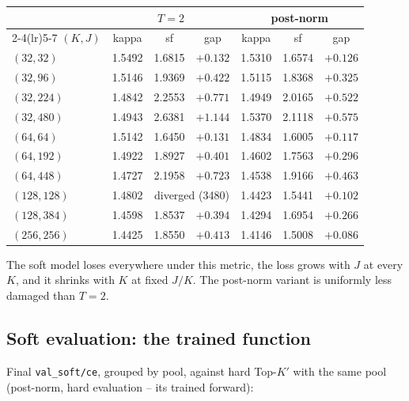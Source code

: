 \documentclass[11pt,a4paper]{article}
\newcommand{\code}[1]{\texttt{#1}}
\newcommand{\Kp}{K'}
\begin{document}
\begin{center}\small
\begin{tabular}{lcccccc}
\toprule
& \multicolumn{3}{c}{$T=2$} & \multicolumn{3}{c}{post-norm} \\
\cmidrule(lr){2-4}\cmidrule(lr){5-7}
$(K,J)$ & kappa & sf & gap & kappa & sf & gap \\
\midrule
$(32,32)$   & 1.5492 & 1.6815 & $+0.132$ & 1.5310 & 1.6574 & $+0.126$ \\
$(32,96)$   & 1.5146 & 1.9369 & $+0.422$ & 1.5115 & 1.8368 & $+0.325$ \\
$(32,224)$  & 1.4842 & 2.2553 & $+0.771$ & 1.4949 & 2.0165 & $+0.522$ \\
$(32,480)$  & 1.4943 & 2.6381 & $+1.144$ & 1.5370 & 2.1118 & $+0.575$ \\
$(64,64)$   & 1.5142 & 1.6450 & $+0.131$ & 1.4834 & 1.6005 & $+0.117$ \\
$(64,192)$  & 1.4922 & 1.8927 & $+0.401$ & 1.4602 & 1.7563 & $+0.296$ \\
$(64,448)$  & 1.4727 & 2.1958 & $+0.723$ & 1.4538 & 1.9166 & $+0.463$ \\
$(128,128)$ & 1.4802 & \multicolumn{2}{c}{diverged (3480)} & 1.4423 & 1.5441 & $+0.102$ \\
$(128,384)$ & 1.4598 & 1.8537 & $+0.394$ & 1.4294 & 1.6954 & $+0.266$ \\
$(256,256)$ & 1.4425 & 1.8550 & $+0.413$ & 1.4146 & 1.5008 & $+0.086$ \\
\bottomrule
\end{tabular}
\end{center}

The soft model loses everywhere under this metric, the loss grows with $J$ at
every $K$, and it shrinks with $K$ at fixed $J/K$. The post-norm variant is
uniformly less damaged than $T=2$.

\subsection*{Soft evaluation: the trained function}

Final \code{val\_soft/ce}, grouped by pool, against hard Top-$\Kp$ with the
same pool (post-norm, hard evaluation -- its trained forward):
\end{document}
